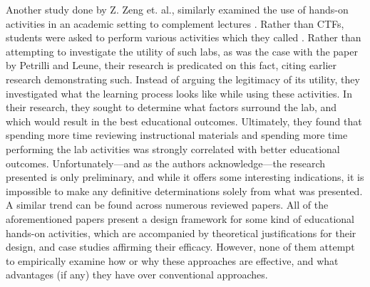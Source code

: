 \documentclass{article}
\begin{document}
    Another study done by Z. Zeng et. al., similarly examined the use of hands-on activities in an academic setting to complement lectures \cite{Z-Zeng}. 
    Rather than CTFs, students were asked to perform various activities which they called . 
    Rather than attempting to investigate the utility of such labs, as was the case with the paper by Petrilli and Leune, their research is predicated on this fact, citing earlier research demonstrating such. 
    Instead of arguing the legitimacy of its utility, they investigated what the learning process looks like while using these activities. 
    In their research, they sought to determine what factors surround the lab, and which would result in the best educational outcomes. 
    Ultimately, they found that spending more time reviewing instructional materials and spending more time performing the lab activities was strongly correlated with better educational outcomes. 
    Unfortunately---and as the authors acknowledge---the research presented is only preliminary, and while it offers some interesting indications, it is impossible to make any definitive determinations solely from what was presented. 
    A similar trend can be found across numerous reviewed papers\cite{Y-Deng,W-Du,N-Eliot}. 
    All of the aforementioned papers present a design framework for some kind of educational hands-on activities, which are accompanied by theoretical justifications for their design, and case studies affirming their efficacy. 
    However, none of them attempt to empirically examine how or why these approaches are effective, and what advantages (if any) they have over conventional approaches. 
\end{document}
